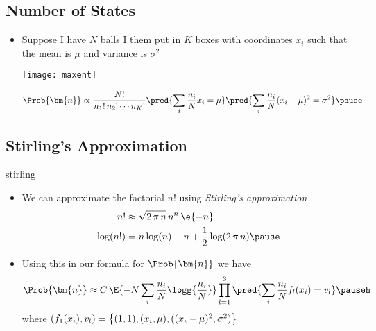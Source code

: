 \Outline %

\begin{slide}
\section[-2]{Number of States}

\begin{PauseHighLight}
  \begin{itemize}
  \item Suppose I have $N$ balls I them put in $K$ boxes with coordinates
    $x_i$ such that the mean is $\mu$ and variance is $\sigma^2$\pause
    \begin{center}
      \texttt{[image: maxent]}
    \end{center}
    \begin{align*}
      \Prob{\bm{n}} &\propto \frac{N!}{n_1!\,n_2!\cdots n_K!}
                      \pred{ \sum_i \frac{n_i}{N} x_i = \mu }
                      \pred{ \sum_i \frac{n_i}{N} (x_i-\mu)^2 = \sigma^2 } \pause
    \end{align*}
  \end{itemize}
\end{PauseHighLight}

\end{slide}


\begin{slide}
\section[0]{Stirling's Approximation}

\begin{rightImage}[0.2]{stirling}
  \begin{PauseHighLight}
  \small
  \begin{itemize}
  \item We can approximate the factorial $n!$ using \emph{Stirling's
      approximation}
    \begin{align*}
      n! &\approx \sqrt{2\,\pi\,n}\, n^n\,\e{-n} \\
      \log(n!) &= n \log(n) - n + \frac{1}{2}\log(2\,\pi\,n)\pause
    \end{align*}
  \item Using this in our formula for $\Prob{\bm{n}}$ we have
    \begin{align*}
      \Prob{\bm{n}} \approx C \, \E{- N \sum_i \frac{n_i}{N} \logg{\frac{n_i}{N}} }
      \prod_{l=1}^3 \pred{ \sum_i \frac{n_i}{N} f_l(x_i) = v_l }\pauseh
    \end{align*}
    where $(f_1(x_i), v_l) = \left\{\strut (1,1), (x_i, \mu),
      ((x_i-\mu)^2, \sigma^2) \right\}$\pause
  \end{itemize}
  \end{PauseHighLight}
\end{rightImage}
\end{slide}

